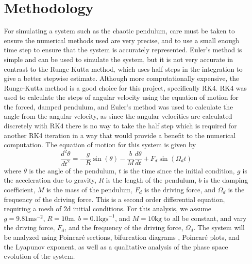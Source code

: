 \documentclass[11pt]{article} %
\begin{document}
\section{Methodology}
    For simulating a system such as the chaotic pendulum, care must be taken to ensure the numerical methods 
    used are very precise, and to use a small enough time step to ensure that the system is accurately represented.
    Euler's method is simple and can be used to simulate the system, but it is not very accurate in contrast to
    the Runge-Kutta method, which uses half steps in the integration to give a better stepwise estimate. Although 
    more computationally expensive, the Runge-Kutta method is a good choice for this project, specifically
    RK4\cite{Strogatz2000}. RK4 was used to calculate the steps of angular velocity using the equation of
    motion for the forced, damped pendulum, and Euler's method was used to calculate the angle from the angular velocity, 
    as since the angular velocities are calculated discretely with RK4 there is no way to take the half step which is required 
    for another RK4 iteration in a way that would provide a benefit to the numerical computation. The equation of motion
    for this system\cite{PhysRevE.53.1579} is given by
    \begin{equation}
        \frac{d^2\theta}{dt^2} = -\frac{g}{R}\sin(\theta) - \frac{b}{M}\frac{d\theta}{dt} + F_d\sin(\Omega_d t)
    \end{equation}
    where $\theta$ is the angle of the pendulum, $t$ is the time since the initial condition, $g$ is the acceleration due to gravity,
    $R$ is the length of the pendulum, $b$ is the damping coefficient, $M$ is the mass of the pendulum, $F_d$ is the driving force,
    and $\Omega_d$ is the frequency of the driving force. This is a second order differential equation, requiring a mesh of 2d initial
    conditions. For this analysis, we assume $g=9.81\text{ms}^{-2}$, $R=10\text{m}$, $b=0.1\text{kgs}^{-1}$, and $M=10\text{kg}$ to all 
    be constant, and vary the driving force, $F_d$, and the frequency of the driving force, $\Omega_d$. The system will be analyzed using 
    Poincar\'e sections\cite{PoincareSection}, bifurcation diagrams \cite{Bifurcation}, Poincar\'e plots\cite{kamen1996poincare}, and the 
    Lyapunov exponent\cite{Lyapunov}, as well as a qualitative analysis of the phase space evolution of the system.\\
\end{document}

